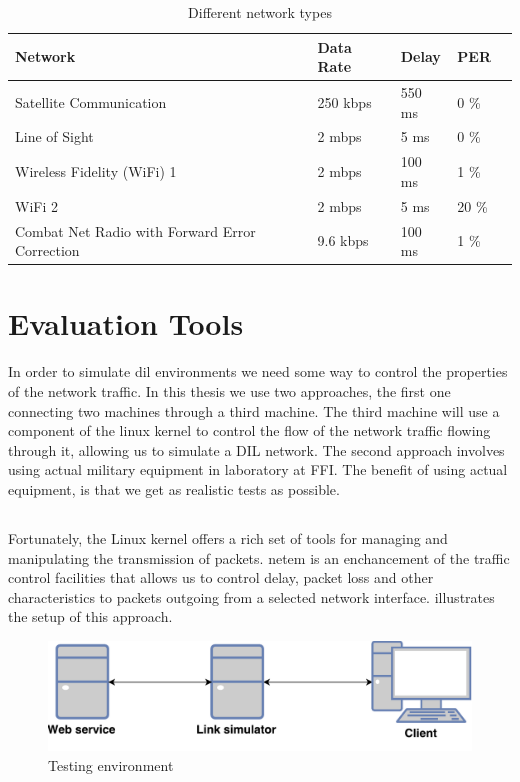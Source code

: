 \begin{table}[h]
\begin{tabular}{| l | l | l | l | l |}
\hline
  \textbf{Network} & \textbf{Data Rate} & \textbf{Delay} & \textbf{PER} \\ \hline
  Satellite Communication & 250 kbps & 550 ms & 0 \% \\ \hline
  Line of Sight & 2 mbps & 5 ms & 0 \% \\ \hline
  Wireless Fidelity (WiFi) 1 & 2 mbps & 100 ms & 1 \% \\ \hline
  WiFi 2 & 2 mbps & 5 ms & 20 \% \\ \hline
  Combat Net Radio with Forward Error Correction & 9.6 kbps & 100 ms & 1 \% \\ \hline

\end{tabular}
\caption{Different network types}
\label{table-network-types}
\end{table}

\section{Evaluation Tools}

In order to simulate \gls{dil} environments we need some way to control the
properties of the network traffic. In this thesis we use two approaches, the
first one connecting two machines through a third machine. The third machine
will use a component of the linux kernel to control the flow of the network
traffic flowing through it, allowing us to simulate a DIL network. The second
approach involves using actual military equipment in laboratory at FFI. The
benefit of using actual equipment, is that we get as realistic tests as
possible.

\subsection{}

Fortunately, the Linux kernel offers a rich set of tools for managing and
manipulating the transmission of packets. \gls{netem} is an enchancement of the
traffic control facilities that allows us to control delay, packet loss and
other characteristics to packets outgoing from a selected network interface.
 illustrates the setup of this approach.


\begin{figure}[h]
\includegraphics[scale=0.6]{images/testing_environment.pdf}
\caption{Testing environment}
\label{figure-testing-environment}
\end{figure}


